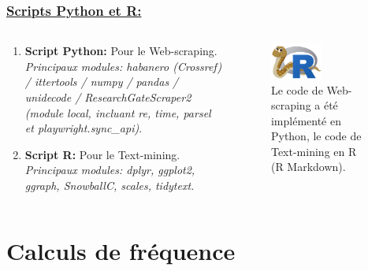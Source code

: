 \documentclass[xcolor=dvipsnames]{beamer}
\begin{document}
	\begin{frame}
		\frametitle{\underline{Scripts Python et R:}}
		\begin{columns}
			\begin{column}{0.5\textwidth} %
				\begin{enumerate}
					\item \textbf{Script Python:} Pour le Web-scraping. \\ \textit{Principaux modules: habanero (Crossref) / ittertools / numpy / pandas / unidecode / ResearchGateScraper2 (module local, incluant re, time, parsel et playwright.sync\_api)}.
					\item \textbf{Script R:} Pour le Text-mining. \\ \textit{Principaux modules: dplyr, ggplot2, ggraph, SnowballC, scales, tidytext.}
				\end{enumerate}
			\end{column}
			\begin{column}{0.5\textwidth}
				\begin{figure}[htb] %
					\begin{center} %
						\includegraphics[width=0.5\textwidth]{image_python_R.png}
						\caption{Le code de Web-scraping a été implémenté en Python, le code de Text-mining en R (R Markdown).\footnotemark}\label{fig_python_R}
					\end{center}
				\end{figure}
			\end{column}
		\end{columns}
	\end{frame}

	\section*{Calculs de fréquence}
\end{document}
